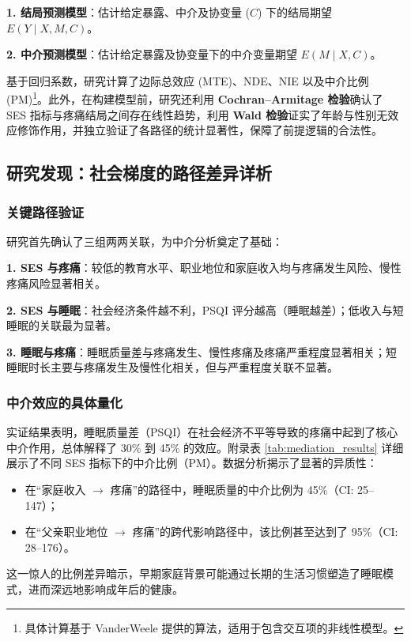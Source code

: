 \documentclass[lang=cn,a4paper,newtx,code=minted,codebg=light]{elegantpaper}
\begin{document}
\textbf{1. 结局预测模型}：估计给定暴露、中介及协变量 ($C$) 下的结局期望 $E(Y \mid X, M, C)$。

\textbf{2. 中介预测模型}：估计给定暴露及协变量下的中介变量期望 $E(M \mid X, C)$。

基于回归系数，研究计算了边际总效应 (MTE)、NDE、NIE 以及中介比例 (PM)\footnote{具体计算基于 VanderWeele 提供的算法，适用于包含交互项的非线性模型。}。此外，在构建模型前，研究还利用 \textbf{Cochran–Armitage 检验}确认了 SES 指标与疼痛结局之间存在线性趋势，利用 \textbf{Wald 检验}证实了年龄与性别无效应修饰作用，并独立验证了各路径的统计显著性，保障了前提逻辑的合法性。

\subsection{研究发现：社会梯度的路径差异详析}

\subsubsection{关键路径验证}
研究首先确认了三组两两关联，为中介分析奠定了基础：

\textbf{1. SES 与疼痛}：较低的教育水平、职业地位和家庭收入均与疼痛发生风险、慢性疼痛风险显著相关。

\textbf{2. SES 与睡眠}：社会经济条件越不利，PSQI 评分越高（睡眠越差）；低收入与短睡眠的关联最为显著。

\textbf{3. 睡眠与疼痛}：睡眠质量差与疼痛发生、慢性疼痛及疼痛严重程度显著相关；短睡眠时长主要与疼痛发生及慢性化相关，但与严重程度关联不显著。

\subsubsection{中介效应的具体量化}
实证结果表明，睡眠质量差（PSQI）在社会经济不平等导致的疼痛中起到了核心中介作用，总体解释了 30\% 到 45\% 的效应。附录表 \ref{tab:mediation_results} 详细展示了不同 SES 指标下的中介比例（PM）。数据分析揭示了显著的异质性：
\begin{itemize}
    \item 在“家庭收入 $\rightarrow$ 疼痛”的路径中，睡眠质量的中介比例为 45\%（CI: 25--147）；
    \item 在“父亲职业地位 $\rightarrow$ 疼痛”的跨代影响路径中，该比例甚至达到了 95\%（CI: 28--176）。
\end{itemize}

这一惊人的比例差异暗示，早期家庭背景可能通过长期的生活习惯塑造了睡眠模式，进而深远地影响成年后的健康。
\end{document}
